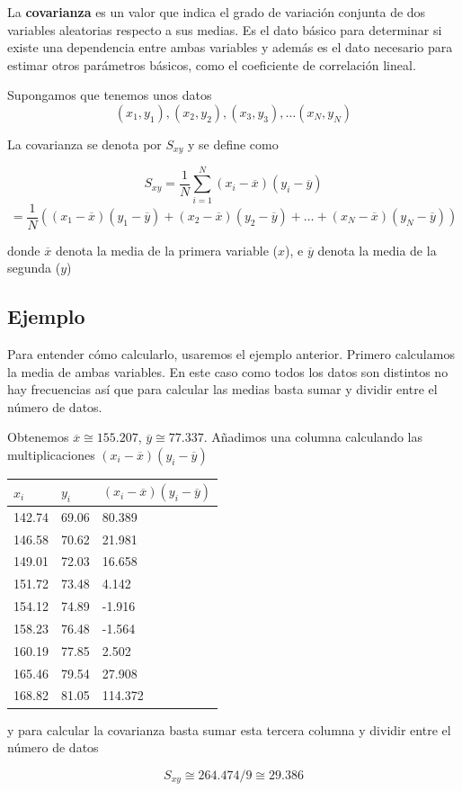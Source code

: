 \documentclass[
]{article}
\begin{document}
La \textbf{covarianza} es un valor que indica el grado de variación
conjunta de dos variables aleatorias respecto a sus medias. Es el dato
básico para determinar si existe una dependencia entre ambas variables y
además es el dato necesario para estimar otros parámetros básicos, como
el coeficiente de correlación lineal.

Supongamos que tenemos unos datos
\[(x_1, y_1), (x_2, y_2), (x_3,y_3), \ldots (x_N,y_N)\]

La covarianza se denota por \(S_{xy}\) y se define como

\[ S_{xy} = \frac{1}{N}\sum^N_{i=1}(x_i - \overline{x})(y_i - \overline{y}) \]
\[ =\frac{1}{N}((x_1- \overline x)(y_1 - \overline y)+ (x_2- \overline x)(y_2 - \overline y)+ \ldots +(x_N- \overline x)(y_N - \overline y))\]

donde \(\overline x\) denota la media de la primera variable (\(x\)), e
\(\overline y\) denota la media de la segunda (\(y\))

\hypertarget{ejemplo-1}{%
\subsection{Ejemplo}\label{ejemplo-1}}

Para entender cómo calcularlo, usaremos el ejemplo anterior. Primero
calculamos la media de ambas variables. En este caso como todos los
datos son distintos no hay frecuencias así que para calcular las medias
basta sumar y dividir entre el número de datos.

Obtenemos \(\overline x \cong155.207\), \(\overline y \cong77.337\).
Añadimos una columna calculando las multiplicaciones
\((x_i - \overline{x})(y_i - \overline{y})\)

\begin{longtable}[]{@{}lll@{}}
\toprule
\(x_i\) & \(y_i\) &
\((x_i - \overline{x})(y_i - \overline{y})\)\tabularnewline
\midrule
\endhead
142.74 & 69.06 & 80.389\tabularnewline
146.58 & 70.62 & 21.981\tabularnewline
149.01 & 72.03 & 16.658\tabularnewline
151.72 & 73.48 & 4.142\tabularnewline
154.12 & 74.89 & -1.916\tabularnewline
158.23 & 76.48 & -1.564\tabularnewline
160.19 & 77.85 & 2.502\tabularnewline
165.46 & 79.54 & 27.908\tabularnewline
168.82 & 81.05 & 114.372\tabularnewline
\bottomrule
\end{longtable}

y para calcular la covarianza basta sumar esta tercera columna y dividir
entre el número de datos

\[S_{xy} \cong 264.474/9 \cong 29.386\]
\end{document}

